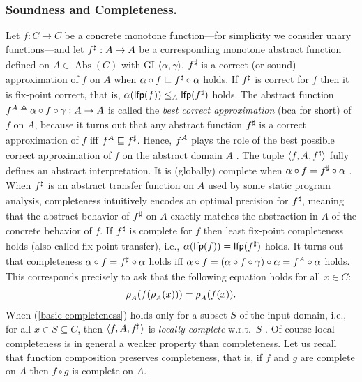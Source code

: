 \documentclass[runningheads]{llncs}
\def\ok#1{\mbox{\raisebox{0ex}[1ex][1ex]{$#1$}}}
\newcommand{\auco}[2]{\ok{\rho^{#1}_{#2}}}
\newcommand{\ra}{\rightarrow}
\DeclareMathOperator{\Abs}{Abs}
\newcommand{\ud}{\ok{\:\triangleq\:}}
\def\ok#1{\mbox{\raisebox{0ex}[1ex][1ex]{$#1$}}}
\def\lfp{{\sf lfp\/}}
\def\cAA{\ensuremath{A}}
\def\tuple#1{\langle #1 \rangle}
\begin{document}
\subsubsection{Soundness and Completeness.}
Let $f:C\ra C$ be a
concrete monotone function---for simplicity 
we consider unary functions---and let
 $\ok{f^\sharp:A \ra A}$ be a corresponding monotone abstract function
 defined on  $\cAA\in \Abs(C)$ with GI $\tuple{\alpha,\gamma}$.
$\ok{f^\sharp}$ is a correct (or sound) approximation of $f$ on $A$
when $\ok{\alpha \circ f \sqsubseteq f^\sharp\circ \alpha}$ holds. 
If $\ok{f^\sharp}$ is correct for $f$ then it is fix-point correct, that is, 
$\alpha(\lfp(f)) \leq_A  \lfp(\ok{f^\sharp})$ holds. 
The abstract function
$\ok{f^A \ud \alpha \circ f \circ \gamma: A\rightarrow A}$ 
is called the {\em best
correct approximation\/} (bca for short) of $f$ on $A$, because it turns out that any abstract
function
$\ok{f^\sharp}$ is a correct approximation of $f$ iff $\ok{f^A \sqsubseteq f^\sharp}$.
Hence,
$\ok{f^A}$ plays the role of the 
best possible correct approximation of $f$ on the abstract domain $A$ \cite{CC79}. The tuple $\tuple{f,\cAA,\ok{f^\sharp}}$ fully defines an abstract interpretation. It is 
(globally) complete when  
$\ok{\alpha \circ f = f^\sharp \circ \alpha}$
\cite{CC79,GRS00}. When $\ok{f^\sharp}$ is an abstract transfer function on $A$ used by some static program analysis, completeness intuitively encodes an optimal precision for $\ok{f^\sharp}$, meaning 
that the abstract behavior of $\ok{f^\sharp}$ on $A$ 
exactly matches the abstraction in $A$ of the concrete behavior of $f$.  
If $\ok{f^\sharp}$ is complete for $f$ then
least fix-point completeness holds (also called fix-point transfer), i.e.,
$\alpha(\lfp(f)) =  \lfp(\ok{f^\sharp})$ holds. 
It turns out  that completeness $\ok{\alpha \circ f = f^\sharp \circ \alpha}$  holds  
iff $\ok{\alpha\circ f = (\alpha\circ f\circ\gamma)\circ \alpha = f^A \circ \alpha}$ holds.  
This corresponds precisely to ask that the following equation holds for all $x\in C$:
\begin{equation}\label{basic-completeness}
\auco{}{\cAA}(f(\auco{}{\cAA}(x)))=\auco{}{\cAA}(f(x)).
\end{equation}
When (\ref{basic-completeness}) holds only for a subset $S$ of the input domain, i.e., for all $x\in S\subseteq C$, then $\tuple{f,\cAA,\ok{f^\sharp}}$ is {\em locally complete} w.r.t.\ $S$ \cite{BruniGGR21}. Of course local completeness is in general a weaker property than completeness. 
Let us recall that function composition preserves completeness, that is, if $f$ and $g$ are complete on $A$ then $f\circ g$ is complete on $A$.
\end{document}
